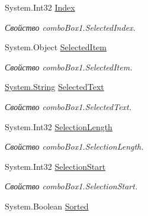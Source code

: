 \begin{DoxyCompactItemize}
System.\+Int32 \mbox{\hyperlink{class_f_b_a_1_1_sys_d_b_edit_aef8f3fa71385908a050aba50d6ccdf5e}{Index}}
\begin{DoxyCompactList}\small\item\em Свойство combo\+Box1.\+Selected\+Index. \end{DoxyCompactList}\item 
System.\+Object \mbox{\hyperlink{class_f_b_a_1_1_sys_d_b_edit_ab7bc603ce3a4d91f18f65905b68832ea}{Selected\+Item}}
\begin{DoxyCompactList}\small\item\em Свойство combo\+Box1.\+Selected\+Item. \end{DoxyCompactList}\item 
\mbox{\hyperlink{namespace_f_b_a_a940b390561ecfbdb6e1606ec1711bd59a27118326006d3829667a400ad23d5d98}{System.\+String}} \mbox{\hyperlink{class_f_b_a_1_1_sys_d_b_edit_ab32b98db2f7001d33f7c5b7d331062d9}{Selected\+Text}}
\begin{DoxyCompactList}\small\item\em Свойство combo\+Box1.\+Selected\+Text. \end{DoxyCompactList}\item 
System.\+Int32 \mbox{\hyperlink{class_f_b_a_1_1_sys_d_b_edit_a1dc7ba8fb759e70dd56b0c672ba496f4}{Selection\+Length}}
\begin{DoxyCompactList}\small\item\em Свойство combo\+Box1.\+Selection\+Length. \end{DoxyCompactList}\item 
System.\+Int32 \mbox{\hyperlink{class_f_b_a_1_1_sys_d_b_edit_a231db11fa090bab4c32809802b4641dc}{Selection\+Start}}
\begin{DoxyCompactList}\small\item\em Свойство combo\+Box1.\+Selection\+Start. \end{DoxyCompactList}\item 
System.\+Boolean \mbox{\hyperlink{class_f_b_a_1_1_sys_d_b_edit_a7b11d1d01e1722584df2b62a7b4a79d2}{Sorted}}

\end{DoxyCompactItemize}
